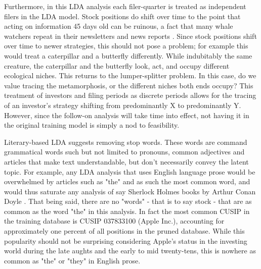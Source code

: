 Furthermore, in this LDA analysis each filer-quarter is treated as independent filers in the LDA model. Stock positions do shift over time to the point that acting on information 45 days old can be ruinous, a fact that many whale watchers repeat in their newsletters and news reports \citep{Whale_Watching_CNBC_12,cramerwhale}. Since stock positions shift over time to newer strategies, this should not pose a problem; for example this would treat a caterpillar and a butterfly differently.  While indubitably the same creature, the caterpillar and the butterfly look, act, and occupy different ecological niches.  This returns to the lumper-splitter problem. In this case, do we value tracing the metamorphosis, or the different niches both ends occupy?  This treatment of investors and filing periods as discrete periods allows for the tracing of an investor's strategy shifting from predominantly X to predominantly Y.  However, since the follow-on analysis will take time into effect, not having it in the original training model is simply a nod to feasibility. 

Literary-based LDA suggests removing stop words.  These words are command grammatical words such but not limited to pronouns, common adjectives and articles  that make text understandable, but don't necessarily convey the latent topic. For example, any LDA analysis that uses English language prose would be overwhelmed by articles such as "the" and as such the most common word, and would thus saturate any analysis of say Sherlock Holmes books by Arthur Conan Doyle \citep{Silge2018}.  That being said, there are no "words" - that is to say stock - that are as common as the word "the" in this analysis.  In fact the most common CUSIP in the training database is CUSIP 037833100 (Apple Inc.), accounting for approximately one percent of all positions in the pruned database. While this popularity should not be surprising considering Apple's status in the investing world during the late aughts and the early to mid twenty-tens, this is nowhere as common as "the" or "they" in English prose.   

